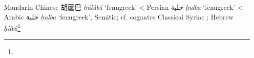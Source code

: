 \begin{etymology}\label{ety:huluba}
Mandarin Chinese {胡蘆巴} \textit{húlúbā} `fenugreek'
< Persian {حلبة} \textit{ḥulba} `fenugreek'
< Arabic {حلبة} \textit{ḥulba} `fenugreek', Semitic; cf. cognates Classical Syriac ; Hebrew ‎ \textit{ḥilbā}\footnote{}
\end{etymology}